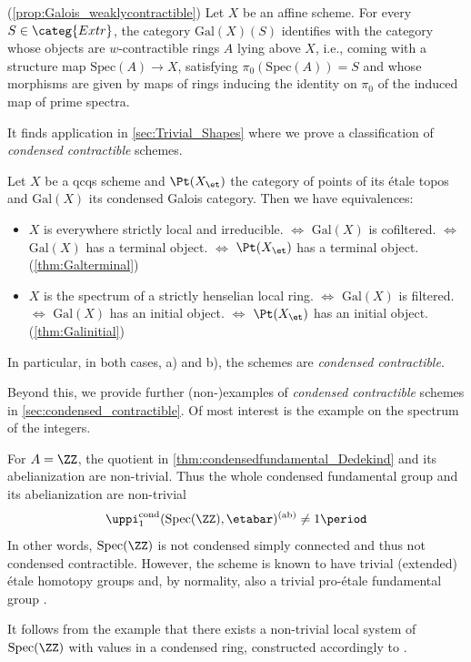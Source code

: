 \documentclass[leqno]{article}
\newcommand{\ab}{\mathrm{ab}}
\renewcommand{\Gal}{\mathrm{Gal}}
\newcommand{\Extr}{\categ{Extr}}
\newcommand{\cond}{\mathrm{cond}}
\newcommand{\picond}{\uppi^{\cond}}
\newcommand{\pionecond}{\picond_1}
\renewcommand{\Spec}{\mathrm{Spec}}
\begin{document}
\begin{theorem}{(\cref{prop:Galois_weaklycontractible})}
Let $X$ be an affine scheme. For every $S \in \Extr$, the category $\Gal(X)(S)$ identifies with the category whose objects are $w$-contractible rings $A$ lying above $X$, i.e., coming with a structure map $\Spec(A) \rightarrow X$, satisfying $\pi_0(\Spec(A))=S$ and whose morphisms are given by maps of rings inducing the identity on $\pi_0$ of the induced map of prime spectra.
\end{theorem}
It finds application in \cref{sec:Trivial_Shapes} where we prove a classification of \textit{condensed contractible} schemes.
%
\begin{theorem}
Let $X$ be a qcqs scheme and $\Pt(X_{\et})$ the category of points of its \'etale topos and $\Gal(X)$ its condensed Galois category. Then we have equivalences:
\begin{itemize}
\item[a)] $X$ is everywhere strictly local and irreducible. $\iff$ $\Gal(X)$ is cofiltered. $\iff$ $\Gal(X)$ has a terminal object.  $\iff$ $\Pt(X_{\et})$ has a terminal object. (\cref{thm:Galterminal})
\item[b)] $X$ is the spectrum of a strictly henselian local ring. $\iff$ $\Gal(X)$ is filtered. $\iff$ $\Gal(X)$ has an initial object. $\iff$ $\Pt(X_{\et})$ has an initial object. (\cref{thm:Galinitial})
\end{itemize}
In particular, in both cases, a) and b), the schemes are \textit{condensed contractible}.
\end{theorem}
%
Beyond this, we provide further (non-)examples of \textit{condensed contractible} schemes in \cref{sec:condensed_contractible}. Of most interest is the example on the spectrum of the integers.
\begin{example}
For $A=\ZZ$, the quotient in \cref{thm:condensedfundamental_Dedekind} and its abelianization are non-trivial. Thus the whole condensed fundamental group and its abelianization are non-trivial $$\picond_1(\Spec(\ZZ),\etabar)^{(\ab)}\neq 1\period $$
In other words, $\Spec(\ZZ)$ is not condensed simply connected and thus not condensed contractible.
However, the scheme is known to have trivial (extended) \'etale homotopy groups \cite[Example 11.2.2]{Exodromy} and, by normality, also a trivial pro-\'etale fundamental group \cite[Lemma 7.4.10]{MR3379634}. 
\end{example}
%
It follows from the example that there exists a non-trivial local system of $\Spec(\ZZ)$ with values in a condensed ring, constructed accordingly to \cite[Example 7.10]{The_condensed_homotopy_type}.
\end{document}
